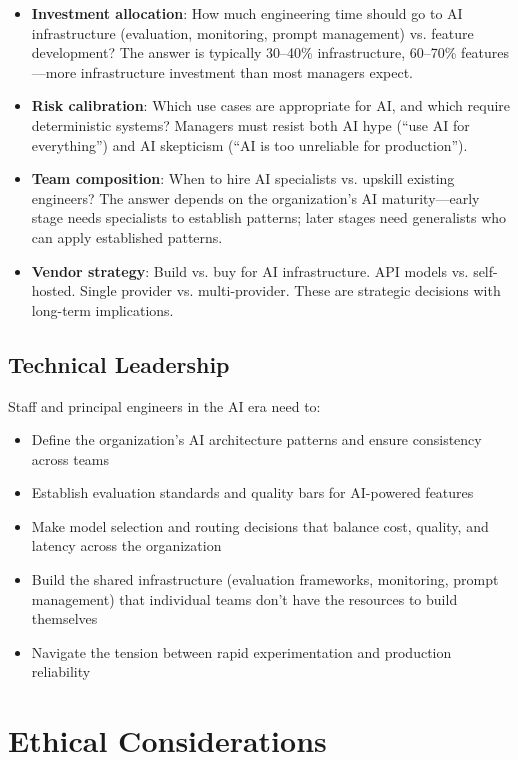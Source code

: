 \begin{itemize}[leftmargin=*]
    \item \textbf{Investment allocation}: How much engineering time should go to AI infrastructure (evaluation, monitoring, prompt management) vs. feature development? The answer is typically 30--40\% infrastructure, 60--70\% features---more infrastructure investment than most managers expect.
    \item \textbf{Risk calibration}: Which use cases are appropriate for AI, and which require deterministic systems? Managers must resist both AI hype (``use AI for everything'') and AI skepticism (``AI is too unreliable for production'').
    \item \textbf{Team composition}: When to hire AI specialists vs. upskill existing engineers? The answer depends on the organization's AI maturity---early stage needs specialists to establish patterns; later stages need generalists who can apply established patterns.
    \item \textbf{Vendor strategy}: Build vs. buy for AI infrastructure. API models vs. self-hosted. Single provider vs. multi-provider. These are strategic decisions with long-term implications.
\end{itemize}

\subsection{Technical Leadership}

Staff and principal engineers in the AI era need to:

\begin{itemize}[leftmargin=*]
    \item Define the organization's AI architecture patterns and ensure consistency across teams
    \item Establish evaluation standards and quality bars for AI-powered features
    \item Make model selection and routing decisions that balance cost, quality, and latency across the organization
    \item Build the shared infrastructure (evaluation frameworks, monitoring, prompt management) that individual teams don't have the resources to build themselves
    \item Navigate the tension between rapid experimentation and production reliability
\end{itemize}


\section{Ethical Considerations}


